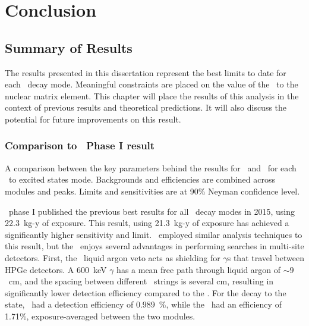 \documentclass[/main.tex]{subfiles}
\begin{document}
\graphicspath{{./pics/}{ch6/pics/}}

\onlyinsubfile{\textpages}
\chapter{Conclusion}
\section{Summary of Results}
The results presented in this dissertation represent the best limits to date for each  \bbes\ decay mode.
Meaningful constraints are placed on the value of the \bbes\ to the  nuclear matrix element.
This chapter will place the results of this analysis in the context of previous results and theoretical predictions.
It will also discuss the potential for future improvements on this result.

\subsection{Comparison to \Gerda\ Phase I result}
\begin{table}[t]
  \centering
  \caption[Comparison between results from the \MJD\ and \Gerda]{\label{tab:mjdgerdacomp}
    A comparison between the key parameters behind the results for \MJD\ and \Gerda\ for each \tnbb\ to excited states mode. Backgrounds and efficiencies are combined across modules and peaks. Limits and sensitivities are at 90\% Neyman confidence level.
  }
  
  
\end{table}
\Gerda\ phase I published the previous best results for all \tnbb\ decay modes in 2015, using 22.3~kg-y of exposure\cite{gerdaESresult}.
This result, using 21.3~kg-y of exposure has achieved a significantly higher sensitivity and limit.
\Gerda\ employed similar analysis techniques to this result, but the \MJD\ enjoys several advantages in performing searches in multi-site detectors.
First, the \Gerda\ liquid argon veto acts as shielding for $\gamma$s that travel between HPGe detectors.
A 600~keV $\gamma$ has a mean free path through liquid argon of ${\sim}9$~cm, and the spacing between different \Gerda\ strings is several cm, resulting in significantly lower detection efficiency compared to the \MJD.
For the decay to the  state, \Gerda\ had a detection efficiency of 0.989~\%, while the \MJD\ had an efficiency of 1.71\%, exposure-averaged between the two modules.
\end{document}
